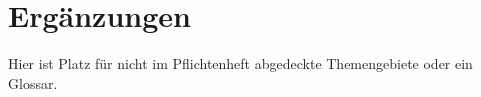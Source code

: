 \section{Ergänzungen}
Hier ist Platz für nicht im Pflichtenheft abgedeckte Themengebiete oder ein
Glossar.
